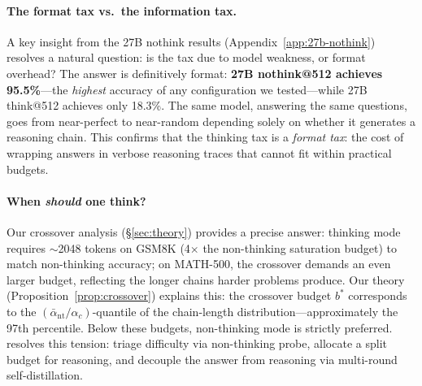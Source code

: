 \paragraph{The format tax vs.\ the information tax.}
A key insight from the 27B nothink results (Appendix~\ref{app:27b-nothink}) resolves a natural question: is the tax due to model weakness, or format overhead?
The answer is definitively format: \textbf{27B nothink@512 achieves 95.5\%}---the \emph{highest} accuracy of any configuration we tested---while 27B think@512 achieves only 18.3\%.
The same model, answering the same questions, goes from near-perfect to near-random depending solely on whether it generates a reasoning chain.
This confirms that the thinking tax is a \emph{format tax}: the cost of wrapping answers in verbose reasoning traces that cannot fit within practical budgets.

\paragraph{When \emph{should} one think?}
Our crossover analysis (\S\ref{sec:theory}) provides a precise answer: thinking mode requires ${\sim}$2048 tokens on GSM8K (4$\times$ the non-thinking saturation budget) to match non-thinking accuracy; on MATH-500, the crossover demands an even larger budget, reflecting the longer chains harder problems produce.
Our theory (Proposition~\ref{prop:crossover}) explains this: the crossover budget $b^*$ corresponds to the $(\bar{\alpha}_{\mathrm{nt}}/\alpha_c)$-quantile of the chain-length distribution---approximately the 97th percentile.
Below these budgets, non-thinking mode is strictly preferred.
\method{} resolves this tension: triage difficulty via non-thinking probe,
allocate a split budget for reasoning, and decouple the answer from reasoning via multi-round self-distillation.

